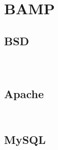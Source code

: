 \chapter{BAMP}



\section{BSD}


\begin{lstlisting}[language=bash]

\end{lstlisting}





\begin{lstlisting}[language=bash]

\end{lstlisting}



\begin{lstlisting}[language=bash]

\end{lstlisting}



\section{Apache}




\begin{lstlisting}[language=bash]

\end{lstlisting}



\begin{lstlisting}[language=bash]

\end{lstlisting}



\section{MySQL}


\begin{lstlisting}[language=bash]

\end{lstlisting}



\begin{lstlisting}[language=bash]

\end{lstlisting}



